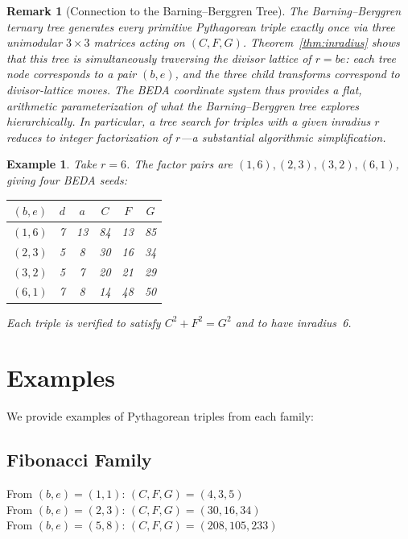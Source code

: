 \documentclass[12pt]{article}
\newtheorem{remark}{Remark}
\newtheorem{example}{Example}
\begin{document}
\begin{remark}[Connection to the Barning--Berggren Tree]
The Barning--Berggren ternary tree \cite{barning,berggren} generates every primitive Pythagorean triple exactly once via three unimodular $3{\times}3$ matrices acting on $(C,F,G)$.  Theorem~\ref{thm:inradius} shows that this tree is simultaneously traversing the \emph{divisor lattice} of $r = be$: each tree node corresponds to a pair $(b,e)$, and the three child transforms correspond to divisor-lattice moves.  The BEDA coordinate system thus provides a flat, arithmetic parameterization of what the Barning--Berggren tree explores hierarchically.  In particular, a tree search for triples with a given inradius $r$ reduces to integer factorization of $r$---a substantial algorithmic simplification.
\end{remark}

\begin{example}
Take $r = 6$.  The factor pairs are $(1,6),(2,3),(3,2),(6,1)$, giving four BEDA seeds:
\begin{center}
\begin{tabular}{cccccc}
\toprule
$(b,e)$ & $d$ & $a$ & $C$ & $F$ & $G$ \\
\midrule
$(1,6)$ & 7 & 13 & 84 & 13 & 85 \\
$(2,3)$ & 5 & 8  & 30 & 16 & 34 \\
$(3,2)$ & 5 & 7  & 20 & 21 & 29 \\
$(6,1)$ & 7 & 8  & 14 & 48 & 50 \\
\bottomrule
\end{tabular}
\end{center}
Each triple is verified to satisfy $C^2 + F^2 = G^2$ and to have inradius~6.
\end{example}

\section{Examples}

We provide examples of Pythagorean triples from each family:

\subsection{Fibonacci Family}
From $(b, e) = (1, 1)$: $(C, F, G) = (4, 3, 5)$\\
From $(b, e) = (2, 3)$: $(C, F, G) = (30, 16, 34)$\\
From $(b, e) = (5, 8)$: $(C, F, G) = (208, 105, 233)$
\end{document}
